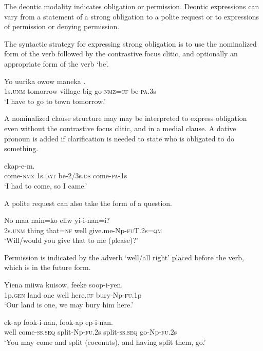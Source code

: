 The deontic modality indicates obligation or permission. Deontic expressions can vary from a statement of a strong obligation to a polite request or to expressions of permission or denying permission. 

The syntactic strategy for expressing strong obligation is to use the nominalized form of the verb followed by the contrastive focus clitic, and optionally an appropriate form of the verb `be'. 

\ea%
\label{ex:6:x1077}
\gll Yo  uurika  owow  maneka    . \\
1s.\textsc{unm}  tomorrow  village  big  go-\textsc{nmz}=\textsc{cf}  be-\textsc{pa}.3s\\
\glt `I have to go to town tomorrow.'
\z

A nominalized clause structure may may be interpreted to express obligation even without the contrastive focus clitic, and in a medial clause. A dative pronoun is added if clarification is needed to state who is obligated to do something. 

\ea%
\label{ex:6:x1079}
\gll {}      ekap-e-m. \\
come-\textsc{nmz}  1s.\textsc{dat}  be-2/3s.\textsc{ds}  come-\textsc{pa}-1s\\
\glt `I had to come, so I came.'
\z

A polite request can also take the form of a question.

\ea%
\label{ex:6:x1163}
\gll No  maa  nain=ko  eliw  yi-i-nan=i? \\
2s.\textsc{unm}  thing  that=\textsc{nf}  well  give.me-Np-\textsc{fu}T.2s=\textsc{qm}\\
\glt `Will/would you give that to me (please)?'
\z

Permission is indicated by the adverb  `well/all right' placed before the verb, which is in the future form.

\ea%
\label{ex:6:x1085}
\gll Yiena  miiwa  kuisow,    feeke  soop-i-yen. \\
1p.\textsc{gen}  land  one  well  here.\textsc{cf}  bury-Np-\textsc{fu}.1p\\
\glt `Our land is one, we may bury him here.'
\z

\ea%
\label{ex:6:x1086}
\gll {}  ek-ap  fook-i-nan,  fook-ap  ep-i-nan. \\
well  come-\textsc{ss}.\textsc{seq}  split-Np-\textsc{fu}.2s  split-\textsc{ss}.\textsc{seq}  go-Np-\textsc{fu}.2s\\
\glt `You may come and split (coconuts), and having split them, go.'
\z

